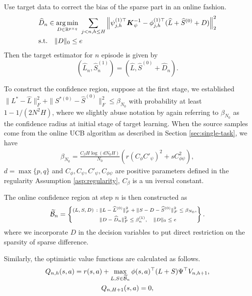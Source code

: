  
 Use target data to correct the bias of the sparse part in an online fashion. 
\begin{equation}
\begin{aligned}
&\widehat  D_n\in \underset{  D \in\mathbb{R}^{p\times q}}{\arg\min}\;  \sum_{j<n, h\le H}\left\lVert\psi_{j,h}^{(1)\top} \boldsymbol{K}_{\psi}^{-1} - \phi_{j,h}^{(1)\top} (\widehat L + \widehat S^{(0)} +  D) \right\rVert_2^2 \\
&\text{s.t.}\quad \|  D\|_{0}\le e
\end{aligned}
\label{eq:tl-step2}
\end{equation}
Then the target estimator for $n$ episode is given by \begin{equation}\label{def:transfer-estimator}(\hat L_n,\hat S_n^{(1)})=(\hat L,\hat  S^{(0)}+\hat   D_n).\end{equation}

To construct the confidence region, suppose at the first stage, we established $\|L^*-\hat L\|_F^2+\|S^{*(0)}-\hat S^{(0)}\|_F^2\le \beta_{N_0}$ with probability at least $1-1/(2N^2H)$, where we slightly abuse notation by again referring to $\beta_{N_0}$ as the confidence radius at initial stage of target learning. When the source samples come from the online UCB algorithm as described in Section \ref{sec:single-task}, we have 
\begin{align}\label{eqn:initial-radius}
\beta_{N_0}=\frac{C_\beta H\log(dN_0H)}{N_0}\left(r(C_\phi C'_{\psi})^2 +sC_{\phi\psi}^2\right),
\end{align} %
$d=\max\{p, q\}$ and $C_\phi,C_\psi,C'_\psi,C_{\phi\psi}$ are positive parameters defined in the regularity Assumption \ref{asp:regularity}, $C_\beta$ is a un iversal constant.

The online confidence region at step $n$ is then constructed as 
\begin{equation}
\label{def:confidence-region-transfer}
\widetilde{{\cal B}}_n 
= {\scriptsize\left\{
\begin{aligned}
 (L,S,D)\,:\;& \|L - \widehat L^{(0)}\|_F^2 + \|S - D - \widehat S^{(0)}\|_F^2 \le \beta_{N_0},\\& \|D - \widehat D_n\|_F^2 \le \beta_n^{(1)},\quad\|D\|_0 \le e
\end{aligned}
\right\}.}
\end{equation}
where we incorporate $D$ in the decision variables to put direct restriction on the sparsity of sparse difference.

Similarly, the optimistic value functions are calculated as follows.
\begin{gather}
\label{eq:updateQ-transfer}
Q_{n, h}(s, a) = r(s, a) + \max_{ L, S\in\widetilde{{\cal B}}_n}\phi(s, a)^{\top} ( L+ S)  \Psi^{\top} V_{n, h+1}, \\
Q_{n, H+1}(s, a) = 0,  
\nonumber
\end{gather}

